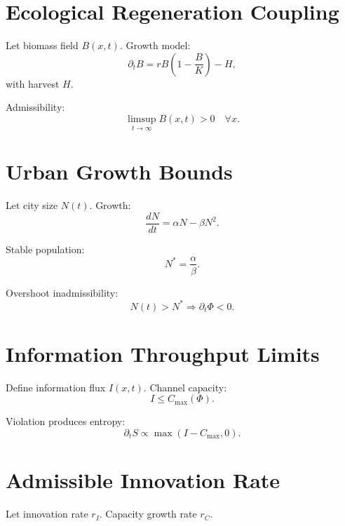 \documentclass[12pt,oneside]{book}
\begin{document}
\chapter{Ecological Regeneration Coupling}

Let biomass field \(B(x,t)\).
Growth model:
\begin{equation}
\partial_t B = r B\left(1 - \frac{B}{K}\right) - H,
\end{equation}
with harvest \(H\).

Admissibility:
\begin{equation}
\limsup_{t\to\infty} B(x,t) > 0 \quad \forall x.
\end{equation}

\chapter{Urban Growth Bounds}

Let city size \(N(t)\).
Growth:
\begin{equation}
\frac{dN}{dt} = \alpha N - \beta N^2.
\end{equation}

Stable population:
\begin{equation}
N^* = \frac{\alpha}{\beta}.
\end{equation}

Overshoot inadmissibility:
\begin{equation}
N(t) > N^* \Rightarrow \partial_t \Phi < 0.
\end{equation}

\chapter{Information Throughput Limits}

Define information flux \(I(x,t)\).
Channel capacity:
\begin{equation}
I \le C_{\max}(\Phi).
\end{equation}

Violation produces entropy:
\begin{equation}
\partial_t S \propto \max(I - C_{\max},0).
\end{equation}

\chapter{Admissible Innovation Rate}

Let innovation rate \(r_I\).
Capacity growth rate \(r_C\).
\end{document}
